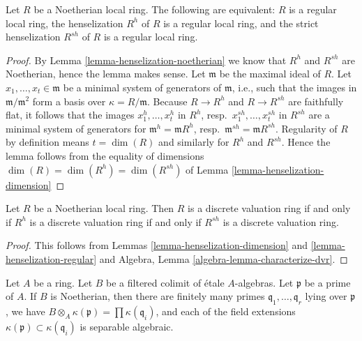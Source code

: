 \begin{lemma}
\label{lemma-henselization-regular}
Let $R$ be a Noetherian local ring. The following are equivalent:
$R$ is a regular local ring, the henselization $R^h$ of $R$ is a regular
local ring, and the strict henselization $R^{sh}$ of $R$ is a regular
local ring.
\end{lemma}

\begin{proof}
By
Lemma \ref{lemma-henselization-noetherian}
we know that $R^h$ and $R^{sh}$ are Noetherian, hence the lemma makes
sense. Let $\mathfrak m$ be the maximal ideal of $R$.
Let $x_1, \ldots, x_t \in \mathfrak m$ be a minimal system of
generators of $\mathfrak m$, i.e., such that the images in
$\mathfrak m/\mathfrak m^2$ form a basis over $\kappa = R/\mathfrak m$.
Because $R \to R^h$ and $R \to R^{sh}$ are faithfully flat, it follows
that the images $x_1^h, \ldots, x_t^h$ in $R^h$,
resp.\  $x_1^{sh}, \ldots, x_t^{sh}$ in $R^{sh}$
are a minimal system of generators for
$\mathfrak m^h = \mathfrak mR^h$,
resp.\ $\mathfrak m^{sh} = \mathfrak mR^{sh}$.
Regularity of $R$ by definition means $t = \dim(R)$ and similarly
for $R^h$ and $R^{sh}$. Hence the lemma follows from the equality
of dimensions $\dim(R) = \dim(R^h) = \dim(R^{sh})$ of
Lemma \ref{lemma-henselization-dimension}
\end{proof}

\begin{lemma}
\label{lemma-henselization-dvr}
Let $R$ be a Noetherian local ring. Then $R$ is a discrete valuation ring
if and only if $R^h$ is a discrete valuation ring if and only if
$R^{sh}$ is a discrete valuation ring.
\end{lemma}

\begin{proof}
This follows from Lemmas \ref{lemma-henselization-dimension} and
\ref{lemma-henselization-regular} and
Algebra, Lemma \ref{algebra-lemma-characterize-dvr}.
\end{proof}

\begin{lemma}
\label{lemma-filtered-colimit-etale-noetherian-fibres}
Let $A$ be a ring. Let $B$ be a filtered colimit of \'etale $A$-algebras.
Let $\mathfrak p$ be a prime of $A$. If $B$ is Noetherian, then
there are finitely many primes $\mathfrak q_1, \ldots, \mathfrak q_r$
lying over $\mathfrak p$, we have
$B \otimes_A \kappa(\mathfrak p) = \prod \kappa(\mathfrak q_i)$, and
each of the field extensions
$\kappa(\mathfrak p) \subset \kappa(\mathfrak q_i)$ is separable algebraic.
\end{lemma}

